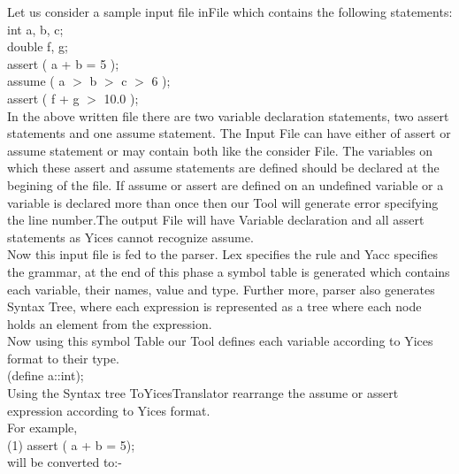\documentclass{svmult}
\begin{document}
Let us consider a sample input file inFile which contains the following statements:\\

int a, b, c;\\

double f, g;\\

assert ( a + b = 5 );\\

assume ( a $>$ b $>$ c $>$ 6 );\\

assert ( f + g $>$ 10.0 );\\


In the above written file there are two variable declaration statements, two assert
statements and one assume statement. The Input File can have either of assert or 
assume statement or may contain both like the consider File. The variables on
which these assert and assume statements are defined should be declared at the
begining of the file. If assume or assert are defined on an undefined variable 
or a variable is declared more than once then our Tool will generate error specifying
the line number.The output File will have Variable declaration and all assert 
 statements as Yices cannot recognize assume.\\

Now this input file is fed to the parser. Lex specifies the rule and Yacc specifies 
the grammar, at the end of this phase a symbol table is generated which contains each
variable, their names, value and type.  Further more, parser also generates Syntax
Tree, where each expression is represented as a tree where each node holds an element
from the expression. \\

Now using this symbol Table our Tool defines each variable according to Yices format
to their type.  \\

     (define a::int);\\
     
  Using the Syntax tree ToYicesTranslator rearrange the assume or assert expression 
  according to Yices format. \\
  For example,\\
     
    (1)   assert ( a + b = 5);\\
       
   will be converted to:-\\
   
\end{document}
